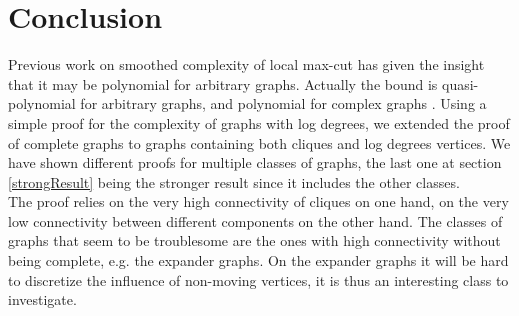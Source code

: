 \section{Conclusion}

Previous work on smoothed complexity of local max-cut has given the insight that it may be polynomial for arbitrary graphs. Actually the bound is quasi-polynomial \cite{etscheid2017smoothed} for arbitrary graphs, and polynomial for complex graphs \cite{angel2016local}. Using a simple proof for the complexity of graphs with log degrees, we extended the proof of complete graphs to graphs containing both cliques and log degrees vertices. We have shown different proofs for multiple classes of graphs, the last one at section \ref{strongResult} being the stronger result since it includes the other classes. \\
The proof relies on the very high connectivity of cliques on one hand, on the very low connectivity between different components on the other hand. The classes of graphs that seem to be troublesome are the ones with high connectivity without being complete, e.g. the expander graphs. On the expander graphs it will be hard to discretize the influence of non-moving vertices, it is thus an interesting class to investigate. \\
